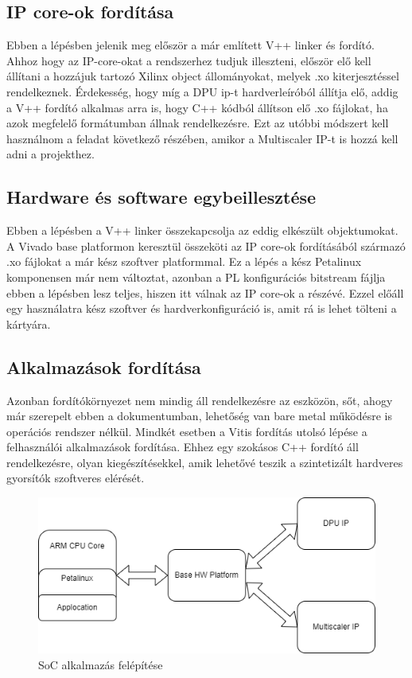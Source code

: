 \subsection{IP core-ok fordítása}
Ebben a lépésben jelenik meg először a már említett V++ linker és fordító. Ahhoz hogy az IP-core-okat a rendszerhez tudjuk illeszteni, először elő kell állítani a hozzájuk tartozó Xilinx object állományokat, melyek .xo kiterjesztéssel rendelkeznek. Érdekesség, hogy míg a DPU ip-t hardverleíróból állítja elő, addig a V++ fordító alkalmas arra is, hogy C++ kódból állítson elő .xo fájlokat, ha azok megfelelő formátumban állnak rendelkezésre. Ezt az utóbbi módszert kell használnom a feladat következő részében, amikor a Multiscaler IP-t is hozzá kell adni a projekthez.

\subsection{Hardware és software egybeillesztése}
Ebben a lépésben a V++ linker összekapcsolja az eddig elkészült objektumokat. A Vivado base platformon keresztül összeköti az IP core-ok fordításából származó .xo fájlokat a már kész szoftver platformmal. Ez a lépés a kész Petalinux komponensen már nem változtat, azonban a PL konfigurációs bitstream fájlja ebben a lépésben lesz teljes, hiszen itt válnak az IP core-ok a részévé. Ezzel előáll egy használatra kész szoftver és hardverkonfiguráció is, amit rá is lehet tölteni a kártyára.

\subsection{Alkalmazások fordítása}
Azonban fordítókörnyezet nem mindig áll rendelkezésre az eszközön, sőt, ahogy már szerepelt ebben a dokumentumban, lehetőség van bare metal működésre is operációs rendszer nélkül. Mindkét esetben a Vitis fordítás utolsó lépése a felhasználói alkalmazások fordítása. Ehhez egy szokásos C++ fordító áll rendelkezésre, olyan kiegészítésekkel, amik lehetővé teszik a szintetizált hardveres gyorsítók szoftveres elérését.

\begin{figure}[!ht]
    \centering
    \includegraphics[width=150mm, keepaspectratio]{figures/vitis.png}
    \caption{SoC alkalmazás felépítése}
\end{figure}

